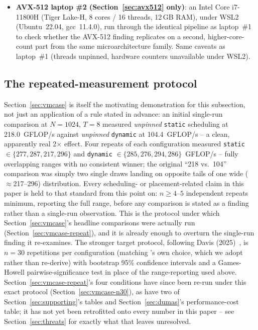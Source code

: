 \documentclass[acmsmall]{acmart}
\begin{document}
\begin{itemize}
    Intel Core i5-1145G7 (Tiger Lake, 4 cores / 8 threads, 16\,GB RAM),
    under WSL2 (Ubuntu~26.04, gcc~15.2.0). \texttt{cpuinfo} reports
    \texttt{avx512f}/\texttt{dq}/\texttt{bw}/\texttt{vl}/\texttt{vnni}/
    \texttt{ifma}. Threads are not pinned, hardware counters are
    unavailable (WSL2), and a single 512-bit FMA unit per core and
    likely frequency throttling make absolute throughput unrepresentative
    of the audited paper's Xeon target.
  \item \textbf{AVX-512 laptop \#2 (Section~\ref{sec:avx512} only)}: an
    Intel Core i7-11800H (Tiger Lake-H, 8 cores / 16 threads, 12\,GB
    RAM), under WSL2 (Ubuntu~22.04, gcc~11.4.0), run through the
    identical pipeline as laptop~\#1 to check whether the AVX-512
    finding replicates on a second, higher-core-count part from the
    same microarchitecture family. Same caveats as laptop~\#1 (threads
    unpinned, hardware counters unavailable under WSL2).
\end{itemize}

\subsection{The repeated-measurement protocol}
\label{sec:repeated}

Section~\ref{sec:vmcase} is itself the motivating demonstration for this
subsection, not just an application of a rule stated in advance: an
initial single-run comparison at $N{=}1024$, $T{=}8$ measured
\emph{unpinned} \texttt{static} scheduling at 218.0~GFLOP/s against
\emph{unpinned} \texttt{dynamic} at 104.4~GFLOP/s -- a clean, apparently
real 2$\times$ effect. Four repeats of each configuration measured
\texttt{static} $\in\{277,287,217,296\}$ and \texttt{dynamic}
$\in\{285,276,294,286\}$~GFLOP/s -- fully overlapping ranges with no
consistent winner; the original ``218 vs.\ 104'' comparison was simply
two single draws landing on opposite tails of one wide ($\approx$217--296)
distribution. Every scheduling- or placement-related claim in this
paper is held to that standard from this point on: $n{\geq}4$--$5$
independent repeats minimum, reporting the full range, before any
comparison is stated as a finding rather than a single-run observation.
This is the protocol under which Section~\ref{sec:vmcase}'s headline
comparisons were actually run (Section~\ref{sec:vmcase-repeat}), and it
is already enough to overturn the single-run finding it re-examines.
The stronger target protocol, following Davis
(2025)~\cite{davis2025hpmm}, is $n=30$ repetitions per configuration
(matching \cite{davis2025hpmm}'s own choice, which we adopt rather than
re-derive) with bootstrap 95\% confidence intervals and a Games-Howell
pairwise-significance test in place of the range-reporting used above.
Section~\ref{sec:vmcase-repeat}'s four conditions have since been
re-run under this exact protocol (Section~\ref{sec:vmcase-n30}), as have
two of Section~\ref{sec:supporting}'s tables and
Section~\ref{sec:dumas}'s performance-cost table; it has not yet been
retrofitted onto every number in this paper -- see
Section~\ref{sec:threats} for exactly what that leaves unresolved.
\end{document}
